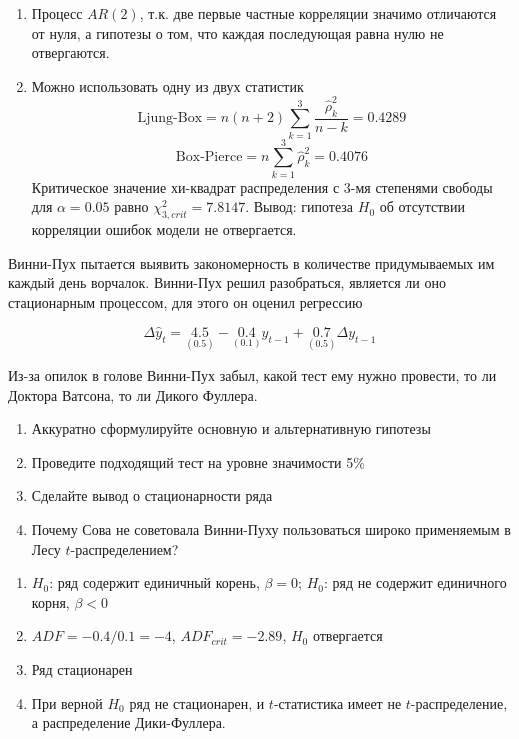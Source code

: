 \begin{solution}
\begin{enumerate}
\item Процесс $AR(2)$, т.к. две первые частные корреляции значимо отличаются от нуля, а гипотезы о том, что каждая последующая равна нулю не отвергаются.
\item Можно использовать одну из двух статистик
\[
\text{Ljung-Box}=n(n+2)\sum_{k=1}^3\frac{\hat{\rho}_k^2}{n-k}=
0.4289
\]
\[
\text{Box-Pierce}=n\sum_{k=1}^3\hat{\rho}_k^2=
0.4076
\]
Критическое значение хи-квадрат распределения с 3-мя степенями свободы для $\alpha=0.05$ равно $\chi^2_{3,crit}=7.8147$.
Вывод: гипотеза $H_0$ об отсутствии корреляции ошибок модели не отвергается.
\end{enumerate}
\end{solution}





\begin{problem}
Винни-Пух пытается выявить закономерность в количестве придумываемых им каждый день ворчалок.  Винни-Пух решил разобраться, является ли оно стационарным процессом, для этого он оценил регрессию

\[ \Delta \hat{y}_t = \underset{(0.5)}{4.5} - \underset{(0.1)}{0.4}y_{t-1} +\underset{(0.5)}{0.7} \Delta y_{t-1} \]

Из-за опилок в голове Винни-Пух забыл, какой тест ему нужно провести, то ли Доктора Ватсона, то ли Дикого Фуллера. 

\begin{enumerate}
\item Аккуратно сформулируйте основную и альтернативную гипотезы
\item Проведите подходящий тест на уровне значимости 5\%
\item Сделайте вывод о стационарности ряда
\item Почему Сова не советовала Винни-Пуху пользоваться широко применяемым в Лесу $t$-распределением?
\end{enumerate}
\end{problem}

\begin{solution}




\begin{enumerate}
\item $H_0$: ряд содержит единичный корень, $\beta=0$; $H_0$: ряд не содержит единичного корня, $\beta<0$
\item $ADF=-0.4/0.1=-4$, $ADF_{crit}=-2.89$, $H_0$ отвергается
\item Ряд стационарен
\item При верной $H_0$ ряд не стационарен, и  $t$-статистика имеет не $t$-распределение, а распределение Дики-Фуллера.
\end{enumerate}
\end{solution}



